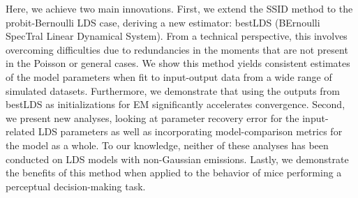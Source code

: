 Here, we achieve two main innovations. First, we extend the SSID method to the probit-Bernoulli LDS case, deriving a new estimator: bestLDS (BErnoulli SpecTral Linear Dynamical System). From a technical perspective, this involves overcoming difficulties due to redundancies in the moments that are not present in the Poisson or general cases. We show this method yields consistent estimates of the model parameters when fit to input-output data from a wide range of simulated datasets. Furthermore, we demonstrate that using the outputs from bestLDS as initializations for EM significantly accelerates convergence. Second, we present new analyses, looking at parameter recovery error for the input-related LDS parameters as well as incorporating model-comparison metrics for the model as a whole. To our knowledge, neither of these analyses has been conducted on LDS models with non-Gaussian emissions. Lastly, we demonstrate the benefits of this method when applied to the behavior of mice performing a perceptual decision-making task.
